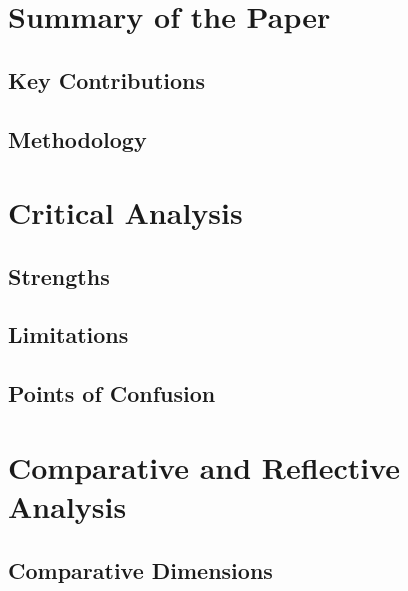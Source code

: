 \documentclass[
10pt, %
a4paper, %
oneside, %
headinclude,footinclude, %
BCOR5mm, %
]{scrartcl}
\begin{document}
\section{Summary of the Paper}

\subsection{Key Contributions}

\subsection{Methodology}

\section{Critical Analysis}

\subsection{Strengths}

\subsection{Limitations}

\subsection{Points of Confusion}

\section{Comparative and Reflective Analysis}

\subsection{Comparative Dimensions}
\end{document}
